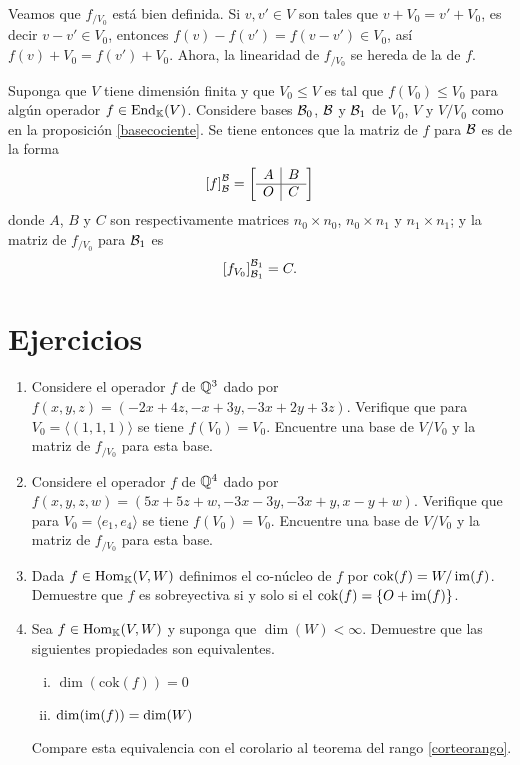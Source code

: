 \dem Veamos que $f_{/V_0}$ está bien definida. Si $v,v'\in V$ son tales que $v+V_0=v'+V_0$, es decir $v-v'\in V_0$, entonces $f(v)-f(v')=f(v-v')\in V_0$, así $f(v)+V_0=f(v')+V_0$. Ahora, la linearidad de $f_{/V_0}$ se hereda de la de $f$.

\begin{obs}\label{matrizcociente}
  Suponga que $V$ tiene dimensión finita y que $V_0\le V$ es tal que $f(V_0)\le V_0$ para algún operador $f\in\operatorname{End}_{\mathbb{K}}(V)$. Considere bases $\mathcal{B}_0$, $\mathcal{B}$ y $\mathcal{B}_1$ de $V_0$, $V$ y $V/V_0$ como en la proposición \ref{basecociente}. Se tiene entonces que la matriz de $f$ para $\mathcal{B}$ es de la forma
  $$
    \left[f\right]_{\mathcal{B}}^{\mathcal{B}}=\left[\begin{array}{c|c}
      A & B\\
      \hline
      O & C
    \end{array}\right]
  $$
donde $A$, $B$ y $C$ son respectivamente matrices $n_0\times n_0$, $n_0\times n_1$ y $n_1\times n_1$; y la matriz de $f_{/V_0}$ para $\mathcal{B}_1$ es
  $$
    \left[f_{V_0}\right]_{\mathcal{B}_1}^{\mathcal{B}_1}=C.
  $$
\end{obs}

\section*{Ejercicios}
\begin{enumerate}
  \item Considere el operador $f$ de $\mathbb{Q}^3$ dado por $f(x,y,z)=(-2x+4z,-x+3y,-3x+2y+3z)$. Verifique que para  $V_0=\langle (1,1,1)\rangle$ se tiene $f(V_0)=V_0$. Encuentre una base de $V/V_0$ y la matriz de $f_{/V_0}$ para esta base.
  \item Considere el operador $f$ de $\mathbb{Q}^4$ dado por $f(x,y,z,w)=(5x+5z+w,-3x-3y,-3x+y,x-y+w)$. Verifique que para  $V_0=\langle e_1,e_4 \rangle$ se tiene $f(V_0)=V_0$. Encuentre una base de $V/V_0$ y la matriz de $f_{/V_0}$ para esta base.
  \item Dada $f\in\operatorname{Hom}_\mathbb{K}(V,W)$ definimos el co-núcleo de $f$ por $\text{cok}(f)=W/\operatorname{im}(f)$. Demuestre que $f$ es sobreyectiva si y solo si el $\text{cok}(f)=\{O+\operatorname{im}(f)\}$.
  \item Sea $f\in\operatorname{Hom}_\mathbb{K}(V,W)$ y suponga que $\dim(W)<\infty$. Demuestre que las siguientes propiedades son equivalentes.
    \begin{enumerate}[(i)]
      \item $\dim(\text{cok}(f))=0$
      \item $\dim(\operatorname{im}(f))=\dim(W)$
    \end{enumerate}
  Compare esta equivalencia con el corolario al teorema del rango \ref{corteorango}.
\end{enumerate}